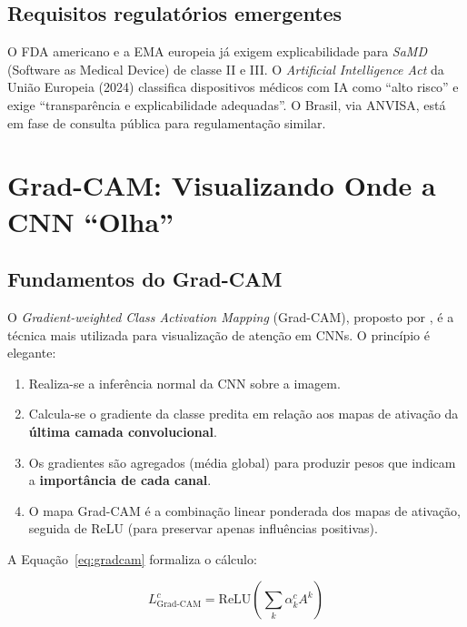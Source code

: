 
\subsection{Requisitos regulatórios emergentes}

O FDA americano e a EMA europeia já exigem explicabilidade para
\textit{SaMD} (Software as Medical Device) de classe II e III. O
\textit{Artificial Intelligence Act} da União Europeia (2024) classifica
dispositivos médicos com IA como ``alto risco'' e exige ``transparência
e explicabilidade adequadas''. O Brasil, via ANVISA, está em fase de
consulta pública para regulamentação similar.

\section{Grad-CAM: Visualizando Onde a CNN ``Olha''}

\subsection{Fundamentos do Grad-CAM}

O \textit{Gradient-weighted Class Activation Mapping} (Grad-CAM),
proposto por , é a técnica mais utilizada
para visualização de atenção em CNNs. O princípio é elegante:

\begin{enumerate}
  \item Realiza-se a inferência normal da CNN sobre a imagem.
  \item Calcula-se o gradiente da classe predita em relação aos mapas
    de ativação da \textbf{última camada convolucional}.
  \item Os gradientes são agregados (média global) para produzir pesos
    que indicam a \textbf{importância de cada canal}.
  \item O mapa Grad-CAM é a combinação linear ponderada dos mapas de
    ativação, seguida de ReLU (para preservar apenas influências positivas).
\end{enumerate}

A Equação~\ref{eq:gradcam} formaliza o cálculo:

\begin{equation}
  L_{\text{Grad-CAM}}^{c} = \text{ReLU}\left(\sum_{k} \alpha_{k}^{c} A^{k}\right)
  \label{eq:gradcam}
\end{equation}

